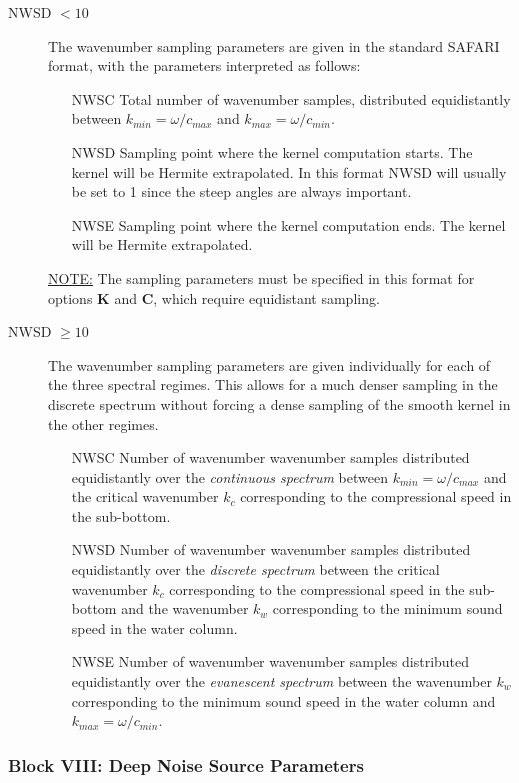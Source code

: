 \begin{description}
\item[NWSD $< 10$] The wavenumber sampling parameters are given in the standard
SAFARI format, with the parameters interpreted as follows:
	\begin{itemize}
	\item[NWSC] Total number of wavenumber samples, distributed
		equidistantly between $k_{min} = \omega / c_{max} $ and 
		$k_{max} = \omega / c_{min} $.
	\item[NWSD] Sampling point where the kernel computation starts. The
		kernel will be Hermite extrapolated. In
		this  format NWSD will usually be set to 1 since the
		steep  angles are always important. 
	\item[NWSE] Sampling point where the kernel computation ends. The
		kernel will be Hermite extrapolated.
	\end{itemize} 
\underline{NOTE:} The sampling parameters must be specified in this format for options {\bf K} and {\bf C}, which require equidistant sampling.
\item[NWSD $\ge 10$] The wavenumber sampling parameters are given
individually for each of the three spectral regimes. This allows for a
much denser sampling in the discrete spectrum without forcing a dense sampling
of the smooth kernel in the other regimes. 
	\begin{itemize}
	\item[NWSC] Number of wavenumber wavenumber samples distributed
		equidistantly over the {\em continuous spectrum} 
		between $k_{min} = \omega / c_{max} $ and
		the critical wavenumber $k_c$ corresponding to the 
		compressional speed in the sub-bottom. 
	\item[NWSD] Number of wavenumber wavenumber samples distributed
		equidistantly over the {\em discrete spectrum} 
		between the critical wavenumber $k_c$ corresponding to the 
		compressional speed in the sub-bottom and the
		wavenumber $k_w$ corresponding to the minimum sound
		speed in the water column.  
	\item[NWSE] Number of wavenumber wavenumber samples distributed
		equidistantly over the {\em evanescent spectrum} 
		between the
		wavenumber $k_w$ corresponding to the minimum sound
		speed in the water column and $k_{max} = \omega / c_{min} $.  
	\end{itemize} 
\end{description}

\subsubsection{Block VIII: Deep Noise Source Parameters}

